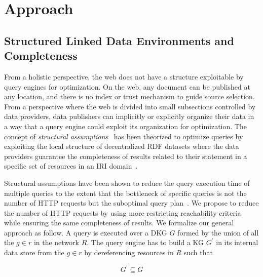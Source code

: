 \section{Approach}



\subsection{Structured Linked Data Environments and Completeness}\label{sec:slde}
From a holistic perspective, the web does not have a structure exploitable by query engines for optimization.
On the web, any document can be published at any location, and there is no index or trust mechanism to guide source selection.
From a perspective where the web is divided into small subsections controlled by data providers, data publishers can implicitly or explicitly organize their data  
in a way that a query engine could exploit its organization for optimization.
The concept of \emph{structural assumptions}~\cite{Taelman2023} has been theorized to optimize queries by exploiting the local structure of decentralized RDF datasets where the data providers 
guarantee the completeness of results related to their statement in a specific set of resources in an IRI domain~\cite{Bogaerts2021LinkTW}.

Structural assumptions have been shown to reduce the query execution time of multiple queries to the extent that the bottleneck of specific queries is not the number of HTTP requests but the suboptimal query plan~\cite{Taelman2023, eschauzier_quweda_linkqueue_2023}.
We propose to reduce the number of HTTP requests by using more restricting reachability criteria~\cite{Hartig2012} while ensuring the same completeness of results.
We formalize our general approach as follow.
A query is executed over a DKG $G$ formed by the union of all the $g \in r$ in the network $R$.
The query engine has to build a KG $G^{\prime}$ in its internal data store from the  $g \in r$ by dereferencing resources in $R$ such that

\begin{equation}\label{eq:subsetDKG}
G^{\prime} \subseteq G
\end{equation}

